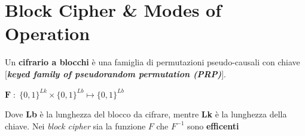 \section{Block Cipher \& Modes of Operation}
Un \textbf{cifrario a blocchi} è una famiglia di permutazioni pseudo-causali con chiave [\textbf{\textit{keyed family of pseudorandom permutation (PRP)}}].

{\centering
    $\mathbf{F} \; : \; \{0, 1\}^{Lk} \times \{0, 1\}^{Lb} \mapsto \{0,1\}^{Lb}$
\par}

\begin{flushleft}
Dove \textbf{Lb} è la lunghezza del blocco da cifrare, mentre \textbf{Lk} è la lunghezza della chiave. Nei \textit{block cipher} sia la funzione $F$ che $F^{-1}$ sono \textbf{efficenti}
\end{flushleft}